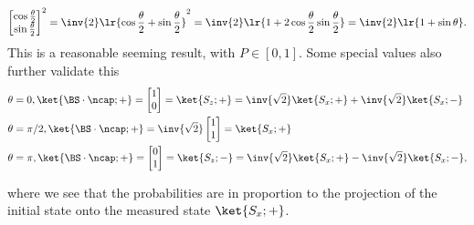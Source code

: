 {\begin{dmath}
{\begin{bmatrix}
\cos\frac{\theta}{2} \\
\sin\frac{\theta}{2}
\end{bmatrix}
}^2
=
\inv{2}
\lr{
\cos\frac{\theta}{2} +
\sin\frac{\theta}{2}
}^2
=
\inv{2}
\lr{ 1 + 2 \cos\frac{\theta}{2} \sin\frac{\theta}{2} }
=
\inv{2}
\lr{ 1 + \sin\theta }.
\end{dmath}
%
This is a reasonable seeming result, with \( P \in [0, 1] \).  Some special values also further validate this
%
\begin{equation}\label{eqn:moreBraKetProblems:760}
\begin{aligned}
\theta &= 0, \ket{\BS \cdot \ncap ; + } =
\begin{bmatrix}
1 \\
0
\end{bmatrix}
=
\ket{S_z ; +}
=
\inv{\sqrt{2}} \ket{S_x;+}
+\inv{\sqrt{2}} \ket{S_x;-}
\\
\theta &= \pi/2, \ket{\BS \cdot \ncap ; + } =
\inv{\sqrt{2}}
\begin{bmatrix}
1 \\
1
\end{bmatrix}
=
\ket{S_x ; +}
\\
\theta &= \pi, \ket{\BS \cdot \ncap ; + } =
\begin{bmatrix}
0 \\
1
\end{bmatrix}
=
\ket{S_z ; -}
=
\inv{\sqrt{2}} \ket{S_x;+}
-\inv{\sqrt{2}} \ket{S_x;-},
\end{aligned}
\end{equation}

where we see that the probabilities are in proportion to the projection of the initial state onto the measured state \( \ket{S_x ; +} \).


}

